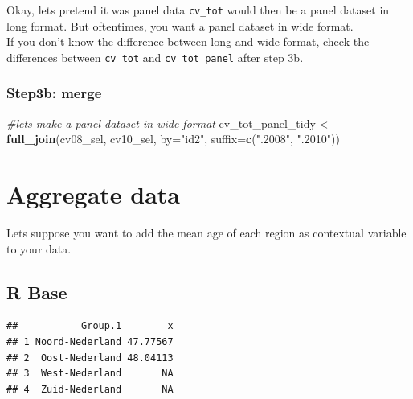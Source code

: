 \documentclass[
]{book}
\newenvironment{Shaded}{\begin{snugshade}}{\end{snugshade}}
\newcommand{\CommentTok}[1]{\textcolor[rgb]{0.56,0.35,0.01}{\textit{#1}}}
\newcommand{\DataTypeTok}[1]{\textcolor[rgb]{0.13,0.29,0.53}{#1}}
\newcommand{\KeywordTok}[1]{\textcolor[rgb]{0.13,0.29,0.53}{\textbf{#1}}}
\newcommand{\NormalTok}[1]{#1}
\newcommand{\OperatorTok}[1]{\textcolor[rgb]{0.81,0.36,0.00}{\textbf{#1}}}
\newcommand{\StringTok}[1]{\textcolor[rgb]{0.31,0.60,0.02}{#1}}
\begin{document}
Okay, lets pretend it was panel data \texttt{cv\_tot} would then be a panel dataset in long format. But oftentimes, you want a panel dataset in wide format.\\
If you don't know the difference between long and wide format, check the differences between \texttt{cv\_tot} and \texttt{cv\_tot\_panel} after step 3b.

\hypertarget{step3b-merge-1}{%
\subsubsection{Step3b: merge}\label{step3b-merge-1}}

\begin{Shaded}
\begin{Highlighting}[numbers=left,,]
\CommentTok{#lets make a panel dataset in wide format}
\NormalTok{cv_tot_panel_tidy <-}\StringTok{ }\KeywordTok{full_join}\NormalTok{(cv08_sel, cv10_sel, }\DataTypeTok{by=}\StringTok{"id2"}\NormalTok{, }\DataTypeTok{suffix=}\KeywordTok{c}\NormalTok{(}\StringTok{".2008"}\NormalTok{, }\StringTok{".2010"}\NormalTok{))}
\end{Highlighting}
\end{Shaded}

\hypertarget{aggregate-data}{%
\section{Aggregate data}\label{aggregate-data}}

Lets suppose you want to add the mean age of each region as contextual variable to your data.

\hypertarget{r-base-4}{%
\subsection{R Base}\label{r-base-4}}

\begin{Shaded}
\end{Shaded}

\begin{verbatim}
##           Group.1        x
## 1 Noord-Nederland 47.77567
## 2  Oost-Nederland 48.04113
## 3  West-Nederland       NA
## 4  Zuid-Nederland       NA
\end{verbatim}
\end{document}
